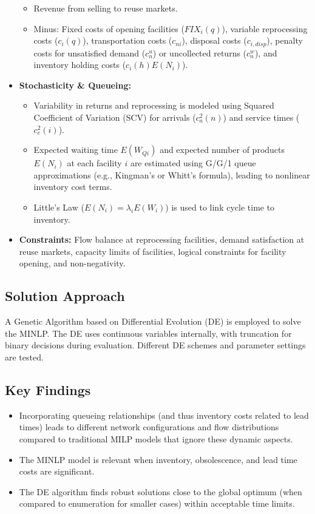 \begin{itemize}
        \begin{itemize}
            \item Revenue from selling to reuse markets.
            \item Minus: Fixed costs of opening facilities ($FIX_i(q)$), variable reprocessing costs ($c_i(q)$), transportation costs ($c_{ni}$), disposal costs ($c_{i,disp}$), penalty costs for unsatisfied demand ($c_n^u$) or uncollected returns ($c_n^w$), and inventory holding costs ($c_i(h)E(N_i)$).
        \end{itemize}
    \item \textbf{Stochasticity \& Queueing:}
        \begin{itemize}
            \item Variability in returns and reprocessing is modeled using Squared Coefficient of Variation (SCV) for arrivals ($c_a^2(n)$) and service times ($c_e^2(i)$).
            \item Expected waiting time $E(W_{Qi})$ and expected number of products $E(N_i)$ at each facility $i$ are estimated using G/G/1 queue approximations (e.g., Kingman's or Whitt's formula), leading to nonlinear inventory cost terms.
            \item Little's Law ($E(N_i) = \lambda_i E(W_i)$) is used to link cycle time to inventory.
        \end{itemize}
    \item \textbf{Constraints:} Flow balance at reprocessing facilities, demand satisfaction at reuse markets, capacity limits of facilities, logical constraints for facility opening, and non-negativity.
\end{itemize}

\subsection*{Solution Approach}
A Genetic Algorithm based on Differential Evolution (DE) is employed to solve the MINLP. The DE uses continuous variables internally, with truncation for binary decisions during evaluation. Different DE schemes and parameter settings are tested.

\subsection*{Key Findings}
\begin{itemize}
    \item Incorporating queueing relationships (and thus inventory costs related to lead times) leads to different network configurations and flow distributions compared to traditional MILP models that ignore these dynamic aspects.
    \item The MINLP model is relevant when inventory, obsolescence, and lead time costs are significant.
    \item The DE algorithm finds robust solutions close to the global optimum (when compared to enumeration for smaller cases) within acceptable time limits.
\end{itemize}

